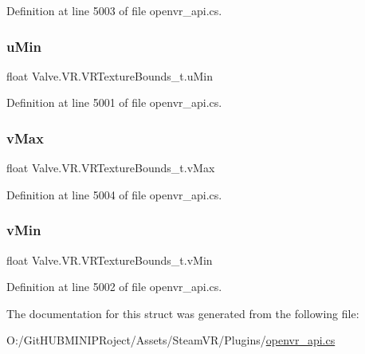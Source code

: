 Definition at line 5003 of file openvr\+\_\+api.\+cs.

\mbox{\label{struct_valve_1_1_v_r_1_1_v_r_texture_bounds__t_acf3246570d44cced89554f62b26fc338}} 
\subsubsection{\texorpdfstring{uMin}{uMin}}
{\footnotesize\ttfamily float Valve.\+V\+R.\+V\+R\+Texture\+Bounds\+\_\+t.\+u\+Min}



Definition at line 5001 of file openvr\+\_\+api.\+cs.

\mbox{\label{struct_valve_1_1_v_r_1_1_v_r_texture_bounds__t_ae807c9a10740b68fbcef3fca1de3ad30}} 
\subsubsection{\texorpdfstring{vMax}{vMax}}
{\footnotesize\ttfamily float Valve.\+V\+R.\+V\+R\+Texture\+Bounds\+\_\+t.\+v\+Max}



Definition at line 5004 of file openvr\+\_\+api.\+cs.

\mbox{\label{struct_valve_1_1_v_r_1_1_v_r_texture_bounds__t_a88fbc926a5f11015254789bc4cc3c25e}} 
\subsubsection{\texorpdfstring{vMin}{vMin}}
{\footnotesize\ttfamily float Valve.\+V\+R.\+V\+R\+Texture\+Bounds\+\_\+t.\+v\+Min}



Definition at line 5002 of file openvr\+\_\+api.\+cs.



The documentation for this struct was generated from the following file\+:\begin{DoxyCompactItemize}
\item 
O\+:/\+Git\+H\+U\+B\+M\+I\+N\+I\+P\+Roject/\+Assets/\+Steam\+V\+R/\+Plugins/\mbox{\hyperlink{openvr__api_8cs}{openvr\+\_\+api.\+cs}}\end{DoxyCompactItemize}
